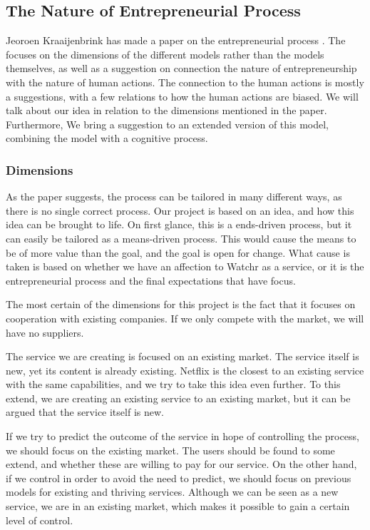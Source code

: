 \subsection{The Nature of Entrepreneurial Process}
\label{sec:gote}
Jeoroen Kraaijenbrink has made a paper on the entrepreneurial process \cite{kraaijenbrink}. The focuses on the dimensions of the different models rather than the models themselves, as well as a suggestion on connection the nature of entrepreneurship with the nature of human actions. The connection to the human actions is mostly a suggestions, with a few relations to how the human actions are biased. We will talk about our idea in relation to the dimensions mentioned in the paper. Furthermore, We bring a suggestion to an extended version of this model, combining the model with a cognitive process.

\subsubsection*{Dimensions}
As the paper suggests, the process can be tailored in many different ways, as there is no single correct process. Our project is based on an idea, and how this idea can be brought to life. On first glance, this is a ends-driven process, but it can easily be tailored as a means-driven process. This would cause the means to be of more value than the goal, and the goal is open for change. What cause is taken is based on whether we have an affection to Watchr as a service, or it is the entrepreneurial process and the final expectations that have focus.

The most certain of the dimensions for this project is the fact that it focuses on cooperation with existing companies. If we only compete with the market, we will have no suppliers.

The service we are creating is focused on an existing market. The service itself is new, yet its content is already existing. Netflix is the closest to an existing service with the same capabilities, and we try to take this idea even further. To this extend, we are creating an existing service to an existing market, but it can be argued that the service itself is new.

If we try to predict the outcome of the service in hope of controlling the process, we should focus on the existing market. The users should be found to some extend, and whether these are willing to pay for our service. On the other hand, if we control in order to avoid the need to predict, we should focus on previous models for existing and thriving services. Although we can be seen as a new service, we are in an existing market, which makes it possible to gain a certain level of control.

